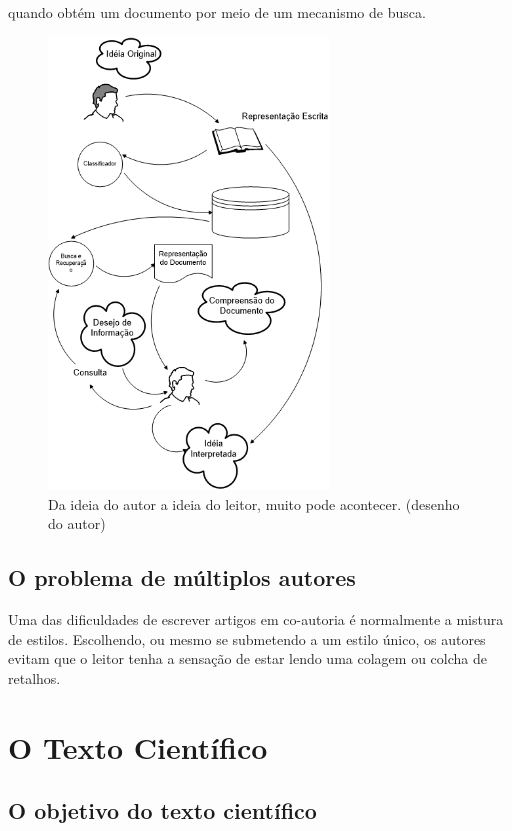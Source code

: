 \documentclass[openany]{book}
\begin{document}
 quando obtém um documento por meio de um mecanismo de busca.

\begin{figure}
    \centering
    \includegraphics[height=12cm]{imagens/textretrieval.png}
    \caption{Da ideia do autor a ideia do leitor, muito pode acontecer. (desenho do autor)}
    \label{fig:tr1}
\end{figure}

\section{O problema de múltiplos autores}

 Uma das dificuldades de escrever artigos em co-autoria é normalmente a mistura de estilos. Escolhendo, ou mesmo se submetendo a um estilo único, os autores evitam que o leitor tenha a sensação de estar lendo uma colagem ou colcha de retalhos.

\chapter{O Texto Científico}

\section{O objetivo do texto científico}
\end{document}
